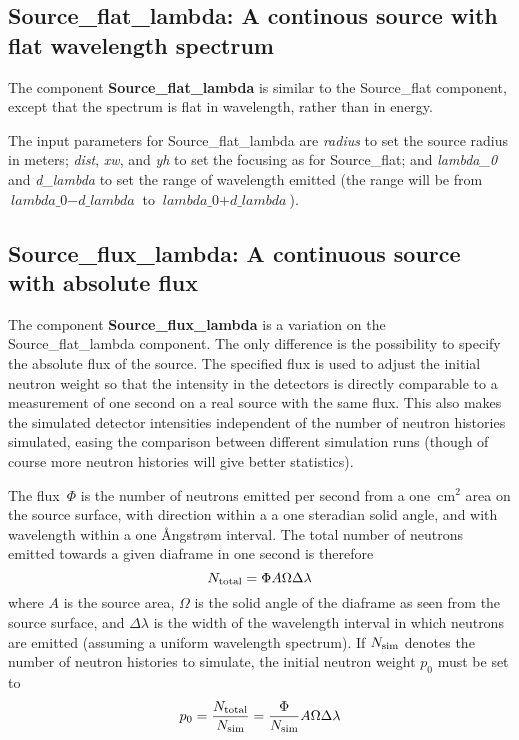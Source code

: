 \subsection{Source\_flat\_lambda: A continous source with flat
  wavelength spectrum}

The component {\bf Source\_flat\_lambda} is similar to the Source\_flat
component, except that the spectrum is flat in wavelength, rather
than in energy.

The input parameters for Source\_flat\_lambda are \textit{radius} to set
the source radius in meters; \textit{dist}, \textit{xw}, and \textit{yh}
to set the focusing as for Source\_flat; and \textit{lambda\_0} and
\textit{d\_lambda} to set the range of wavelength emitted (the range
will be from $\textit{lambda\_0} - \textit{d\_lambda}$ to
$\textit{lambda\_0} + \textit{d\_lambda}$).


\subsection{Source\_flux\_lambda: A continuous source with absolute
  flux}
\label{Source_flux_lambda}

The component {\bf Source\_flux\_lambda} is a variation on the
Source\_flat\_lambda component. The only difference is the possibility
to specify the absolute flux of the source. The specified flux is used
to adjust the initial neutron weight so that the intensity in the
detectors is directly comparable to a measurement of one second on a
real source with the same flux. This also makes the simulated detector
intensities independent of the number of neutron histories simulated,
easing the comparison between different simulation runs (though of
course more neutron histories will give better statistics).

The flux~$\Phi$ is the number of neutrons emitted per second from a
one~cm$^2$ area on the source surface, with direction within a a one
steradian solid angle, and with wavelength within a one {\AA}ngstr{\o}m
interval. The total number of neutrons emitted towards a given diaframe
in one second is therefore
$$ N_{\rm total} = \Phi A \Omega \Delta\lambda $$
where $A$ is the source area, $\Omega$ is the solid angle of the
diaframe as seen from the source surface, and $\Delta\lambda$ is the
width of the wavelength interval in which neutrons are emitted (assuming
a uniform wavelength spectrum). If $N_{\rm sim}$ denotes the number of
neutron histories to simulate, the initial neutron weight $p_0$ must be set to
$$ p_0 = \frac{N_{\rm total}}{N_{\rm sim}} = 
    \frac{\Phi}{N_{\rm sim}} A \Omega \Delta\lambda $$

